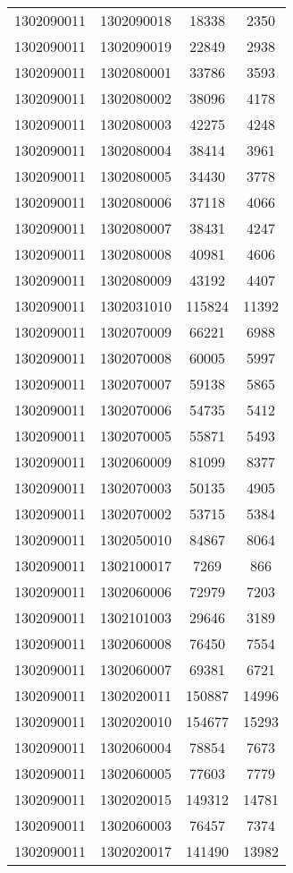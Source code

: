 \begin{longtable}{llcc}
1302090011 & 1302090018 & 18338 & 2350\\
1302090011 & 1302090019 & 22849 & 2938\\
1302090011 & 1302080001 & 33786 & 3593\\
1302090011 & 1302080002 & 38096 & 4178\\
1302090011 & 1302080003 & 42275 & 4248\\
1302090011 & 1302080004 & 38414 & 3961\\
1302090011 & 1302080005 & 34430 & 3778\\
1302090011 & 1302080006 & 37118 & 4066\\
1302090011 & 1302080007 & 38431 & 4247\\
1302090011 & 1302080008 & 40981 & 4606\\
1302090011 & 1302080009 & 43192 & 4407\\
1302090011 & 1302031010 & 115824 & 11392\\
1302090011 & 1302070009 & 66221 & 6988\\
1302090011 & 1302070008 & 60005 & 5997\\
1302090011 & 1302070007 & 59138 & 5865\\
1302090011 & 1302070006 & 54735 & 5412\\
1302090011 & 1302070005 & 55871 & 5493\\
1302090011 & 1302060009 & 81099 & 8377\\
1302090011 & 1302070003 & 50135 & 4905\\
1302090011 & 1302070002 & 53715 & 5384\\
1302090011 & 1302050010 & 84867 & 8064\\
1302090011 & 1302100017 & 7269 & 866\\
1302090011 & 1302060006 & 72979 & 7203\\
1302090011 & 1302101003 & 29646 & 3189\\
1302090011 & 1302060008 & 76450 & 7554\\
1302090011 & 1302060007 & 69381 & 6721\\
1302090011 & 1302020011 & 150887 & 14996\\
1302090011 & 1302020010 & 154677 & 15293\\
1302090011 & 1302060004 & 78854 & 7673\\
1302090011 & 1302060005 & 77603 & 7779\\
1302090011 & 1302020015 & 149312 & 14781\\
1302090011 & 1302060003 & 76457 & 7374\\
1302090011 & 1302020017 & 141490 & 13982\\

\end{longtable}
